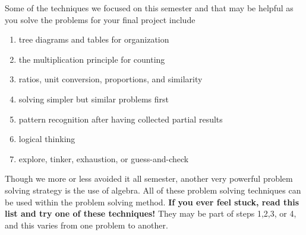 Some of the techniques we focused on this semester and that may be helpful as you solve the problems for your final project include 
\begin{enumerate}
	\item tree diagrams and tables for organization
	\item the multiplication principle for counting
	\item ratios, unit conversion, proportions, and similarity
	\item solving simpler but similar problems first
	\item pattern recognition after having collected partial results
	\item logical thinking
	\item explore, tinker, exhaustion, or guess-and-check
\end{enumerate}
Though we more or less avoided it all semester, another very powerful problem solving strategy is the use of algebra. All of these problem solving techniques can be used within the problem solving method. \textbf{If you ever feel stuck, read this list and try one of these techniques!} They may be part of steps 1,2,3, or 4, and this varies from one problem to another.

